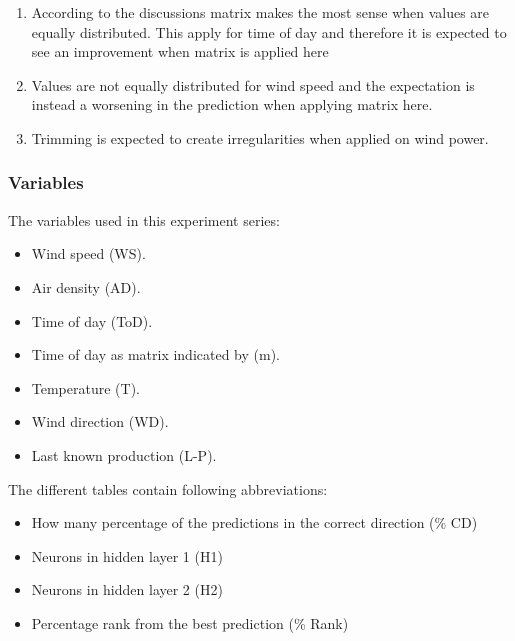 \begin{enumerate}
\item According to the discussions matrix makes the most sense when values are equally distributed. This apply for time of day and therefore it is expected to see an improvement when matrix is applied here
\item Values are not equally distributed for wind speed and the expectation is instead a worsening in the prediction when applying matrix here.
\item Trimming is expected to create irregularities when applied on wind power.
\end{enumerate}

\subsubsection{Variables}
The variables used in this experiment series:

\begin{itemize}
\item Wind speed (WS).
\item Air density (AD).
\item Time of day (ToD).
\item Time of day as matrix indicated by (m).
\item Temperature (T).
\item Wind direction (WD).
\item Last known production (L-P).
\end{itemize}

The different tables contain following abbreviations:

\begin{itemize}
\item How many percentage of the predictions in the correct direction (\% CD)
\item Neurons in hidden layer 1 (H1)
\item Neurons in hidden layer 2 (H2)
\item Percentage rank from the best prediction (\% Rank)
\end{itemize}

